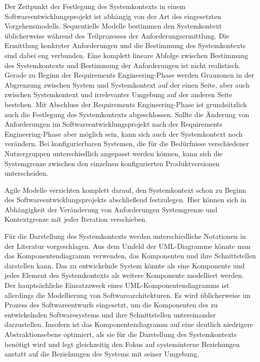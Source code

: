 Der  Zeitpunkt der Festlegung des Systemkontexts in einem Softwareentwicklungsprojekt ist abhängig von der Art des eingesetzten Vorgehensmodells. Sequentielle Modelle bestimmen den Systemkontext üblicherweise während des Teilprozesses der Anforderungsermittlung. Die Ermittlung konkreter Anforderungen und die Bestimmung des Systemkontexts sind dabei eng verbunden. Eine komplett lineare Abfolge zwischen Bestimmung des Systemkontexts und Bestimmung der Anforderungen ist nicht realistisch. Gerade zu Beginn der Requirements Engineering-Phase werden Grauzonen in der Abgrenzung zwischen System und Systemkontext auf der einen Seite, aber auch zwischen Systemkontext und irrelevanter Umgebung auf der anderen Seite bestehen. Mit Abschluss der Requirements Engineering-Phase ist grundsätzlich auch die Festlegung des Systemkontexts abgeschlossen. Sollte die Änderung von Anforderungen im Softwareentwicklungsprojekt nach der Requirements Engineering-Phase aber möglich sein, kann sich auch der Systemkontext noch verändern. Bei konfigurierbaren Systemen, die für die Bedürfnisse verschiedener Nutzergruppen unterschiedlich angepasst werden können, kann sich die Systemgrenze zwischen den einzelnen konfigurierten Produktversionen unterscheiden.

Agile Modelle verzichten komplett darauf, den Systemkontext schon zu Beginn des Softwareentwicklungsprojekts abschließend festzulegen. Hier können sich in Abhängigkeit der Veränderung von Anforderungen Systemgrenze und Kontextgrenze mit jeder Iteration verschieben.

\vspace{2mm} %


Für die Darstellung des Systemkontexts werden unterschiedliche Notationen in der Literatur vorgeschlagen.  Aus dem Umfeld der UML-Diagramme könnte man das Komponentendiagramm verwenden, das Komponenten und ihre Schnittstellen darstellen kann. Das zu entwickelnde System könnte als eine Komponente und jedes Element des Systemkontexts als weitere Komponente modelliert werden. Der hauptsächliche Einsatzzweck eines UML-Komponentendiagramms ist allerdings die Modellierung von Softwarearchitekturen. Es wird üblicherweise im Prozess des Softwareentwurfs eingesetzt, um die Komponenten des zu entwickelnden Software\-systems und ihre Schnittstellen untereinander darzustellen. Insofern ist das Komponentendiagramm auf eine deutlich niedrigere Abstraktionsebene optimiert, als sie für die Darstellung des Systemkontexts benötigt wird und legt gleichzeitig den Fokus auf systeminterne Beziehungen anstatt auf die Beziehungen des Systems mit seiner 
\linebreak %
Umgebung.


